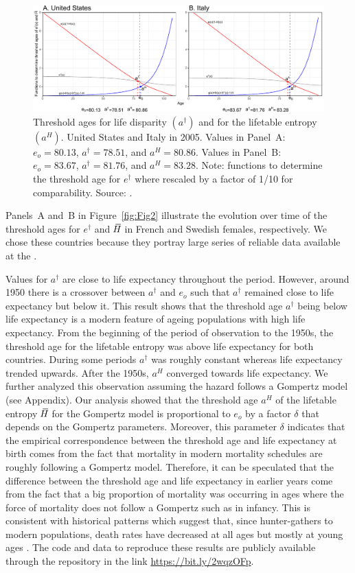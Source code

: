 \documentclass[a4paper,twoside, openright, 12pt, leqno]{article}
\newcommand*\xbar[1]{%
   \hbox{%
     \vbox{%
       \hrule height 0.5pt %
       \kern0.3ex%
       \hbox{%
         \kern-0.28em%
         \ensuremath{#1}%
         \kern-0.05em%
       }%
     }%
   }%
}
\begin{document}
\begin{figure}[h]
  \centering
  \includegraphics[scale=.72]{Figures/Ages2005}
  \caption{Threshold ages for life disparity $(a^\dagger)$ and for the lifetable entropy $(a^H)$. United States and Italy in 2005. Values in Panel~A: $e_o=80.13$, $a^\dagger=78.51$, and $a^H=80.86$. Values in Panel~B: $e_o=83.67$, $a^\dagger=81.76$, and $a^H=83.28$. Note: functions to determine the threshold age for $e^\dagger$ where rescaled by a factor of 1/10 for comparability. Source: \cite{HMD}.}
  \label{fig:Fig1}
\end{figure}

Panels~A and~B in Figure~\ref{fig:Fig2} illustrate the evolution over time of the threshold ages for $e^\dagger$ and $\,\xbar{H}$ in French and Swedish females, respectively. We chose these countries because they portray large series of reliable data available at the \cite{HMD}. 

Values for $a^\dagger$ are close to life expectancy throughout the period. However, around 1950 there is a crossover between $a^\dagger$ and $e_o$ such that $a^\dagger$ remained close to life expectancy but below it. This result shows that the threshold age $a^\dagger$ being below life expectancy is a modern feature of ageing populations with high life expectancy. From the beginning of the period of observation to the 1950s, the threshold age for the lifetable entropy was above life expectancy for both countries. During some periods $a^\dagger$ was roughly constant whereas life expectancy trended upwards. After the 1950s, $a^H$ converged towards life expectancy. We further analyzed this observation assuming the hazard follows a Gompertz model (see Appendix). Our analysis showed that the threshold age $a^H$ of the lifetable entropy $\,\xbar{H}$ for the Gompertz model is proportional to $e_o$ by a factor $\delta$ that depends on the Gompertz parameters. Moreover, this parameter $\delta$ indicates that the empirical correspondence between the threshold age and life expectancy at birth  comes from the fact that mortality in modern mortality schedules are roughly following a Gompertz model. Therefore, it can be speculated that the difference between the threshold age and life expectancy in earlier years come from the fact that a big proportion of mortality was occurring in ages where the force of mortality does not follow a Gompertz such as in infancy. This is consistent with historical patterns which suggest that, since hunter-gathers to modern populations, death rates have decreased at all ages but mostly at young ages \citep{burger2012human}. The code and data to reproduce these results are publicly available through the repository in the link \url{https://bit.ly/2wqzOFp}.
\end{document}
